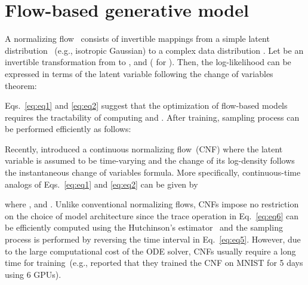 \documentclass{article}
\begin{document}
\section{Flow-based generative model}
A normalizing flow~\citep{rezende2015variational} consists of invertible mappings from a simple latent distribution ~(e.g., isotropic Gaussian) to a complex data distribution . Let  be an invertible transformation from  to  ,  and  ( for ). Then, the log-likelihood  can be expressed in terms of the latent variable  following the change of variables theorem:


Eqs.~\eqref{eq:eq1} and \eqref{eq:eq2} suggest that the optimization of flow-based models requires the tractability of computing  and . After training, sampling process can be performed efficiently as follows:



Recently, \citet{chen2018neural} introduced a continuous normalizing flow~(CNF) where the latent variable is assumed to be time-varying and the change of its log-density follows the instantaneous change of variables formula. More specifically, continuous-time analogs of Eqs.~\eqref{eq:eq1} and \eqref{eq:eq2} can be given by


where ,  and . Unlike conventional normalizing flows, CNFs impose no restriction on the choice of model architecture since  the trace operation in Eq.~\eqref{eq:eq6} can be efficiently computed using the Hutchinson's estimator~\citep{grathwohl2018ffjord} and the sampling process is performed by reversing the time interval in Eq.~\eqref{eq:eq5}. However, due to the large computational cost of the ODE solver, CNFs usually require a long time for training~(e.g., \citet{grathwohl2018ffjord} reported that they trained the CNF on MNIST for 5 days using 6 GPUs).
\end{document}
